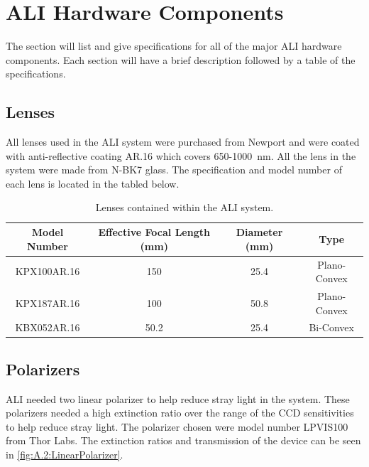 \chapter{ALI Hardware Components}

The section will list and give specifications for all of the major ALI hardware components. Each section will have a brief description followed by a table of the specifications.

\section{Lenses}

All lenses used in the ALI system were purchased from Newport and were coated with anti-reflective coating AR.16 which covers 650-1000~nm. All the lens in the system were made from N-BK7 glass. The specification and model number of each lens is located in the tabled below.

\begin{table}
    \begin{center}
    \begin{tabular}{|c|c|c|c|}
    \hline
    Model Number & Effective Focal Length (mm) & Diameter (mm) & Type  \\
    \hline
    KPX100AR.16 & 150 & 25.4 & Plano-Convex \\
    \hline
    KPX187AR.16 & 100 & 50.8 & Plano-Convex \\
    \hline
    KBX052AR.16 & 50.2 & 25.4 & Bi-Convex \\
    \hline
    \end{tabular}
    \end{center}
    \caption[ALI System Lenses]{Lenses contained within the ALI system.}
    \label{tab:A.1:AliLenes}
\end{table}

\section{Polarizers}

ALI needed two linear polarizer to help reduce stray light in the system. These polarizers needed a high extinction ratio over the range of the CCD sensitivities to help reduce stray light. The polarizer chosen were model number LPVIS100 from Thor Labs. The extinction ratios and transmission of the device can be seen in \autoref{fig:A.2:LinearPolarizer}.

